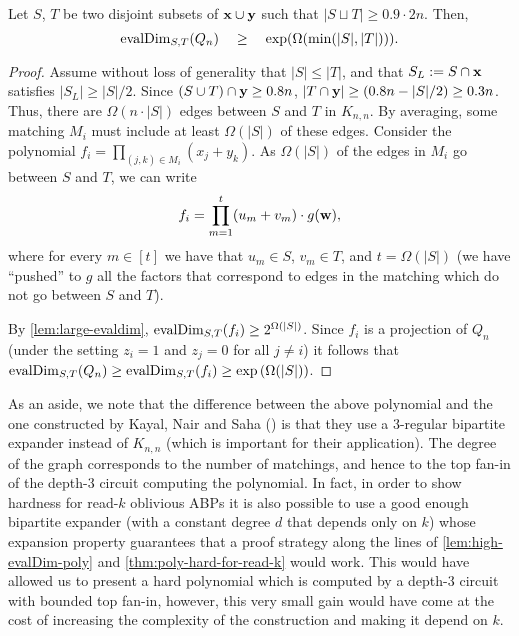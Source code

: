 \documentclass[11pt]{article}
\begin{document}
\begin{lemma} \label{lem:high-evalDim-poly}
Let $S$, $T$ be two disjoint subsets of $\mathbf{x} \cup \mathbf{y}$ such that $|S\sqcup T| \geq 0.9 \cdot 2n$.
Then, 
\[
\operatorname{evalDim}_{S,T}(Q_n) \quad \geq \quad \exp(\Omega(\min(|S|,|T|))).
\]
\end{lemma}
\begin{proof}
  Assume without loss of generality that $|S| \leq |T|$, and that $S_L := S \cap \mathbf{x}$ satisfies $|S_L| \geq |S|/2$.
Since $(S \cup T) \cap \mathbf{y} \ge 0.8n$, $\left| T \cap \mathbf{y} \right| \geq (0.8n - |S|/2) \geq 0.3 n$.
Thus, there are $\Omega(n\cdot  |S|)$ edges between $S$ and $T$ in $K_{n,n}$. 
By averaging, some matching $M_i$ must include at least $\Omega(|S|)$ of these edges. Consider the polynomial $f_i = \prod_{(j,k)\in M_i} (x_j + y_k)$. As $\Omega(|S|)$ of  the edges in $M_i$ go between $S$ and $T$, we can write
\[
f_i = \prod_{m=1}^t (u_m + v_m) \cdot g(\mathbf{w}),
\]
where for every $m \in [t]$ we have that $u_m \in S$, $v_m \in T$, and $t=\Omega(|S|)$ (we have ``pushed'' to $g$ all the factors that correspond to edges in the matching which do not go between $S$ and $T$).

By \autoref{lem:large-evaldim}, $\operatorname{evalDim}_{S,T}(f_i) \geq 2^{\Omega(|S|)}$. Since $f_i$ is a projection of $Q_n$ (under the setting $z_i=1$ and $z_j=0$ for all $j \neq i$) it follows that $\operatorname{evalDim}_{S,T}(Q_n) \geq \operatorname{evalDim}_{S,T}(f_i) \geq \exp{(\Omega(|S|))}$.
\end{proof}

As an aside, we note that the difference between the above polynomial and  the one constructed by Kayal, Nair and Saha (\cite{KNS15}) is that they use a 3-regular bipartite expander instead of $K_{n,n}$ (which is important for their application). The degree of the graph corresponds to the number of matchings, and hence to the top fan-in of the depth-3 circuit computing the polynomial. In fact, in order to show hardness for read-$k$ oblivious ABPs it is also possible to use a good enough bipartite expander (with a constant degree $d$ that depends only on $k$) whose expansion property guarantees that a proof strategy along the lines of \autoref{lem:high-evalDim-poly} and \autoref{thm:poly-hard-for-read-k} would work. This would have allowed us to present a hard polynomial which is computed by a depth-$3$ circuit with bounded top fan-in, however, this very small gain would have come at the cost of increasing the complexity of the construction and making it depend on $k$. %
\end{document}
